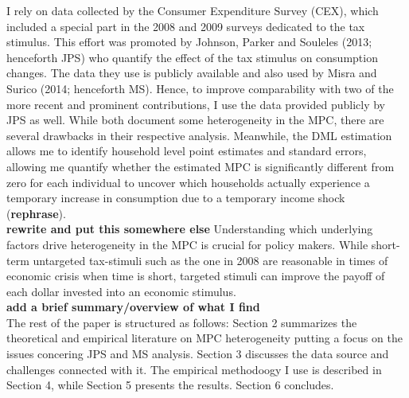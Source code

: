 I rely on data collected by the Consumer Expenditure Survey (CEX), which included a special part in the 2008 and 2009 surveys dedicated to the tax stimulus. This effort was promoted by Johnson, Parker and Souleles (2013; henceforth JPS) who quantify the effect of the tax stimulus on consumption changes. The data they use is publicly available and also used by Misra and Surico (2014; henceforth MS). Hence, to improve comparability with two of the more recent and prominent contributions, I use the data provided publicly by JPS as well. While both document some heterogeneity in the MPC, there are several drawbacks in their respective analysis. Meanwhile, the DML estimation allows me to identify household level point estimates and standard errors, allowing me quantify whether the estimated MPC is significantly different from zero for each individual to uncover which households actually experience a temporary increase in consumption due to a temporary income shock (\textbf{rephrase}). \\
\textbf{rewrite and put this somewhere else}
Understanding which underlying factors drive heterogeneity in the MPC is crucial for policy makers. While short-term untargeted tax-stimuli such as the one in 2008 are reasonable in times of economic crisis when time is short, targeted stimuli can improve the payoff of each dollar invested into an economic stimulus. \\
\textbf{add a brief summary/overview of what I find} \\
The rest of the paper is structured as follows: Section 2 summarizes the theoretical and empirical literature on MPC heterogeneity putting a focus on the issues concering JPS and MS analysis. Section 3 discusses the data source and challenges connected with it. The empirical methodoogy I use is described in Section 4, while Section 5 presents the results. Section 6 concludes.